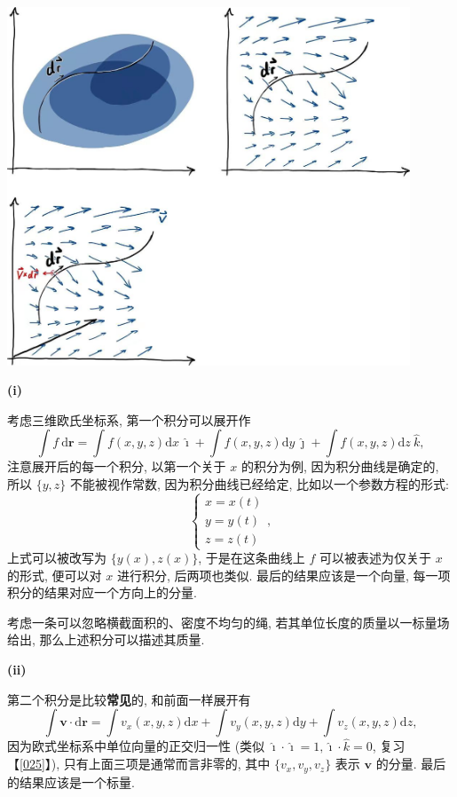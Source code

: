 \begin{tcolorbox}[size=fbox, breakable, enhanced jigsaw]
    \includegraphics[width=0.9\textwidth]{./img/image-20240530065850401.png}
\end{tcolorbox}

\textbf{(i)}

考虑三维欧氏坐标系, 第一个积分可以展开作 \[
\int f\ \mathrm{d}\boldsymbol{r}=\int f(x,y,z)\mathrm{d}x\ \hat{\imath}+\int f(x,y,z)\mathrm{d}y\ \hat{\jmath}+\int f(x,y,z)\mathrm{d}z\ \hat{k},
\] 注意展开后的每一个积分, 以第一个关于 $x$ 的积分为例,
因为积分曲线是确定的, 所以 $\{y,z\}$ 不能被视作常数,
因为积分曲线已经给定, 比如以一个参数方程的形式: \[
\begin{cases}
x=x(t)\\
y=y(t)\\
z=z(t)
\end{cases},
\] 上式可以被改写为 $\{y(x),z(x)\}$, 于是在这条曲线上 $f$
可以被表述为仅关于 $x$ 的形式, 便可以对 $x$ 进行积分, 后两项也类似.
最后的结果应该是一个向量, 每一项积分的结果对应一个方向上的分量.

\begin{newquote}
考虑一条可以忽略横截面积的、密度不均匀的绳,
若其单位长度的质量以一标量场给出, 那么上述积分可以描述其质量.
\end{newquote}

\textbf{(ii)}

第二个积分是比较\textbf{常见}的, 和前面一样展开有 \[
\int\boldsymbol{v}\cdot\mathrm{d}\boldsymbol{r}=\int v_x(x,y,z)\mathrm{d}x+\int v_y(x,y,z)\mathrm{d}y+\int v_z(x,y,z)\mathrm{d}z,
\] 因为欧式坐标系中单位向量的正交归一性 (类似
$\hat{\imath}\cdot\hat{\imath}=1, \hat{\imath}\cdot\hat{k}=0$,
复习【\ref{025}】), 只有上面三项是通常而言非零的, 其中 $\{v_x,v_y,v_z\}$
表示 $\boldsymbol{v}$ 的分量. 最后的结果应该是一个标量.

